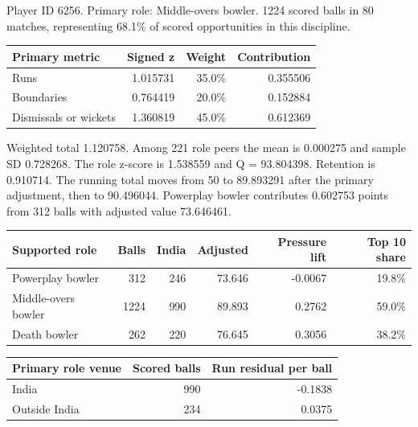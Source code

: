 Player ID 6256. Primary role: Middle-overs bowler. 1224 scored balls in 80 matches, representing 68.1\% of scored opportunities in this discipline.

\begin{center}
\begin{tabularx}{\linewidth}{>{\raggedright\arraybackslash}Xrrr}
\toprule
Primary metric & Signed z & Weight & Contribution \\
\midrule
Runs & 1.015731 & 35.0\% & 0.355506 \\
Boundaries & 0.764419 & 20.0\% & 0.152884 \\
Dismissals or wickets & 1.360819 & 45.0\% & 0.612369 \\
\bottomrule
\end{tabularx}
\end{center}

Weighted total 1.120758. Among 221 role peers the mean is 0.000275 and sample SD 0.728268. The role z-score is 1.538559 and Q = 93.804398. Retention is 0.910714. The running total moves from 50 to 89.893291 after the primary adjustment, then to 90.496044. Powerplay bowler contributes 0.602753 points from 312 balls with adjusted value 73.646461.

\begin{center}
\begin{tabularx}{\linewidth}{>{\raggedright\arraybackslash}Xrrrrr}
\toprule
Supported role & Balls & India & Adjusted & Pressure lift & Top 10 share \\
\midrule
Powerplay bowler & 312 & 246 & 73.646 & -0.0067 & 19.8\% \\
Middle-overs bowler & 1224 & 990 & 89.893 & 0.2762 & 59.0\% \\
Death bowler & 262 & 220 & 76.645 & 0.3056 & 38.2\% \\
\bottomrule
\end{tabularx}
\end{center}

\begin{center}
\begin{tabularx}{\linewidth}{>{\raggedright\arraybackslash}Xrr}
\toprule
Primary role venue & Scored balls & Run residual per ball \\
\midrule
India & 990 & -0.1838 \\
Outside India & 234 & 0.0375 \\
\bottomrule
\end{tabularx}
\end{center}

